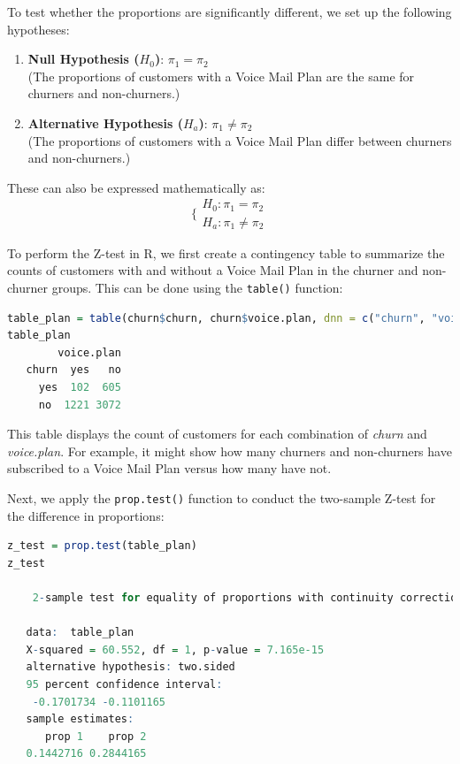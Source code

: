 \documentclass[
]{book}
\newcommand{\passthrough}[1]{#1}
\theoremstyle{definition}
\theoremstyle{definition}
\theoremstyle{definition}
\theoremstyle{definition}
\theoremstyle{remark}
\begin{document}
To test whether the proportions are significantly different, we set up the following hypotheses:

\begin{enumerate}
\def\labelenumi{\arabic{enumi}.}
\item
  \textbf{Null Hypothesis (\(H_0\))}: \(\pi_1 = \pi_2\)\\
  (The proportions of customers with a Voice Mail Plan are the same for churners and non-churners.)
\item
  \textbf{Alternative Hypothesis (\(H_a\))}: \(\pi_1 \neq \pi_2\)\\
  (The proportions of customers with a Voice Mail Plan differ between churners and non-churners.)
\end{enumerate}

These can also be expressed mathematically as:
\[
\bigg\{
\begin{matrix}
    H_0: \pi_1 = \pi_2   \\
    H_a: \pi_1 \neq \pi_2 
\end{matrix}
\]

To perform the Z-test in R, we first create a contingency table to summarize the counts of customers with and without a Voice Mail Plan in the churner and non-churner groups. This can be done using the \passthrough{\lstinline!table()!} function:

\begin{lstlisting}[language=R]
table_plan = table(churn$churn, churn$voice.plan, dnn = c("churn", "voice.plan"))
table_plan
        voice.plan
   churn  yes   no
     yes  102  605
     no  1221 3072
\end{lstlisting}

This table displays the count of customers for each combination of \emph{churn} and \emph{voice.plan}. For example, it might show how many churners and non-churners have subscribed to a Voice Mail Plan versus how many have not.

Next, we apply the \passthrough{\lstinline!prop.test()!} function to conduct the two-sample Z-test for the difference in proportions:

\begin{lstlisting}[language=R]
z_test = prop.test(table_plan)
z_test
   
    2-sample test for equality of proportions with continuity correction
   
   data:  table_plan
   X-squared = 60.552, df = 1, p-value = 7.165e-15
   alternative hypothesis: two.sided
   95 percent confidence interval:
    -0.1701734 -0.1101165
   sample estimates:
      prop 1    prop 2 
   0.1442716 0.2844165
\end{lstlisting}
\end{document}
